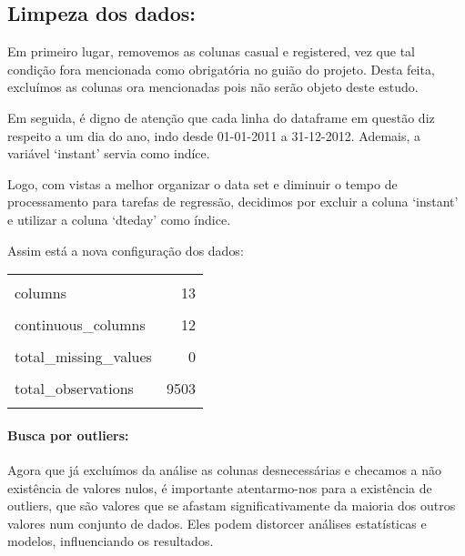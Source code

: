 \documentclass[
  letterpaper,
  DIV=11,
  numbers=noendperiod]{scrartcl}
\let\oldparagraph\paragraph
\renewcommand{\paragraph}[1]{\oldparagraph{#1}\mbox{}}
\begin{document}
\subsection{Limpeza dos dados:}\label{limpeza-dos-dados}

Em primeiro lugar, removemos as colunas casual e registered, vez que tal
condição fora mencionada como obrigatória no guião do projeto. Desta
feita, excluímos as colunas ora mencionadas pois não serão objeto deste
estudo.

Em seguida, é digno de atenção que cada linha do dataframe em questão
diz respeito a um dia do ano, indo desde 01-01-2011 a 31-12-2012.
Ademais, a variável `instant' servia como indíce.

Logo, com vistas a melhor organizar o data set e diminuir o tempo de
processamento para tarefas de regressão, decidimos por excluir a coluna
`instant' e utilizar a coluna `dteday' como índice.

Assim está a nova configuração dos dados:

\begin{table}[!h]
\centering\begingroup\fontsize{10}{12}\selectfont

\begin{tabular}{lr}
\toprule
\cellcolor{gray!15}{rows} & \cellcolor{gray!15}{731}\\
columns & 13\\
\cellcolor{gray!15}{discrete\_columns} & \cellcolor{gray!15}{1}\\
continuous\_columns & 12\\
\cellcolor{gray!15}{all\_missing\_columns} & \cellcolor{gray!15}{0}\\
\addlinespace
total\_missing\_values & 0\\
\cellcolor{gray!15}{complete\_rows} & \cellcolor{gray!15}{731}\\
total\_observations & 9503\\
\cellcolor{gray!15}{memory\_usage} & \cellcolor{gray!15}{102928}\\
\bottomrule
\end{tabular}
\endgroup{}
\end{table}

\paragraph{Busca por outliers:}\label{busca-por-outliers}

Agora que já excluímos da análise as colunas desnecessárias e checamos a
não existência de valores nulos, é importante atentarmo-nos para a
existência de outliers, que são valores que se afastam
significativamente da maioria dos outros valores num conjunto de dados.
Eles podem distorcer análises estatísticas e modelos, influenciando os
resultados.
\end{document}
